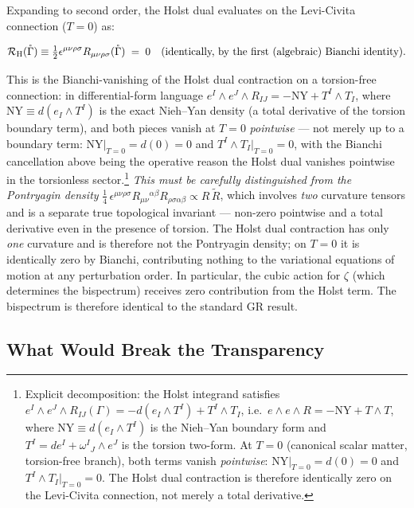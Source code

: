 \documentclass[aps,prd,twocolumn,superscriptaddress,showpacs,preprintnumbers,nofootinbib,longbibliography,floatfix]{revtex4-2}
\begin{document}
Expanding to second order, the Holst dual evaluates on the Levi-Civita
connection ($T=0$) as:
\begin{widetext}
\begin{equation}
\mathcal{R}_{\rm H}(\mathring{\Gamma}) \equiv \tfrac{1}{2}\epsilon^{\mu\nu\rho\sigma}
R_{\mu\nu\rho\sigma}(\mathring{\Gamma}) \;=\; 0
\quad\text{(identically, by the first (algebraic) Bianchi identity)}.
\end{equation}
\end{widetext}
This is the Bianchi-vanishing of the Holst dual contraction on a torsion-free
connection: in differential-form language $e^I\wedge e^J\wedge R_{IJ} =
-\mathrm{NY} + T^I\wedge T_I$, where $\mathrm{NY} \equiv d(e_I\wedge T^I)$
is the exact Nieh--Yan density (a total derivative of the torsion boundary
term), and both pieces vanish at $T=0$ \emph{pointwise} --- not merely up
to a boundary term: $\mathrm{NY}|_{T=0} = d(0) = 0$ and $T^I\wedge T_I|_{T=0}
= 0$, with the Bianchi cancellation above being the operative reason the
Holst dual vanishes pointwise in the torsionless sector.\footnote{\label{fn:NY_decomp}%
Explicit decomposition: the Holst integrand satisfies
$e^I\wedge e^J\wedge R_{IJ}(\Gamma) = -d(e_I\wedge T^I) + T^I\wedge T_I$,
i.e.\ $e\wedge e\wedge R = -\mathrm{NY} + T\wedge T$,
where $\mathrm{NY}\equiv d(e_I\wedge T^I)$ is the Nieh--Yan boundary form
and $T^I = de^I + \omega^I{}_J\wedge e^J$ is the torsion two-form.
At $T=0$ (canonical scalar matter, torsion-free branch), both terms vanish
\emph{pointwise}: $\mathrm{NY}|_{T=0} = d(0) = 0$ and $T^I\wedge T_I|_{T=0} = 0$.
The Holst dual contraction is therefore identically zero on the Levi-Civita
connection, not merely a total derivative.} \emph{This must be carefully
distinguished from the Pontryagin density}
$\frac{1}{4}\,\epsilon^{\mu\nu\rho\sigma}R_{\mu\nu}{}^{\alpha\beta}
R_{\rho\sigma\alpha\beta} \propto R\,\widetilde R$, which involves \emph{two}
curvature tensors and is a separate true topological invariant ---
non-zero pointwise and a total derivative even in the presence of torsion.
The Holst dual contraction has only \emph{one} curvature and is therefore not
the Pontryagin density; on $T=0$ it is identically zero by Bianchi, contributing
nothing to the variational equations of motion at any perturbation order. In
particular, the cubic action for $\zeta$ (which determines the bispectrum)
receives zero contribution from the Holst term. The bispectrum is therefore
identical to the standard GR result.

\subsection{What Would Break the Transparency}
\end{document}

